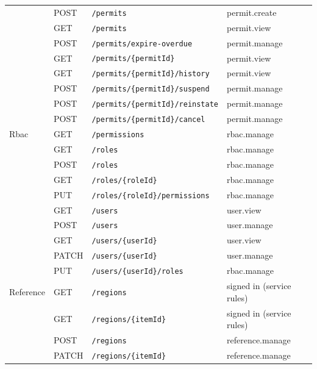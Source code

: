 \begin{longtable}{@{}p{2.1cm}l p{6.6cm} p{3.2cm}@{}}
 & POST & \texttt{/\allowbreak{}permits} & permit.create \\
 & GET & \texttt{/\allowbreak{}permits} & permit.view \\
 & POST & \texttt{/\allowbreak{}permits/\allowbreak{}expire-overdue} & permit.manage \\
 & GET & \texttt{/\allowbreak{}permits/\allowbreak{}\{permitId\}} & permit.view \\
 & GET & \texttt{/\allowbreak{}permits/\allowbreak{}\{permitId\}/\allowbreak{}history} & permit.view \\
 & POST & \texttt{/\allowbreak{}permits/\allowbreak{}\{permitId\}/\allowbreak{}suspend} & permit.manage \\
 & POST & \texttt{/\allowbreak{}permits/\allowbreak{}\{permitId\}/\allowbreak{}reinstate} & permit.manage \\
 & POST & \texttt{/\allowbreak{}permits/\allowbreak{}\{permitId\}/\allowbreak{}cancel} & permit.manage \\
Rbac & GET & \texttt{/\allowbreak{}permissions} & rbac.manage \\
 & GET & \texttt{/\allowbreak{}roles} & rbac.manage \\
 & POST & \texttt{/\allowbreak{}roles} & rbac.manage \\
 & GET & \texttt{/\allowbreak{}roles/\allowbreak{}\{roleId\}} & rbac.manage \\
 & PUT & \texttt{/\allowbreak{}roles/\allowbreak{}\{roleId\}/\allowbreak{}permissions} & rbac.manage \\
 & GET & \texttt{/\allowbreak{}users} & user.view \\
 & POST & \texttt{/\allowbreak{}users} & user.manage \\
 & GET & \texttt{/\allowbreak{}users/\allowbreak{}\{userId\}} & user.view \\
 & PATCH & \texttt{/\allowbreak{}users/\allowbreak{}\{userId\}} & user.manage \\
 & PUT & \texttt{/\allowbreak{}users/\allowbreak{}\{userId\}/\allowbreak{}roles} & rbac.manage \\
Reference & GET & \texttt{/\allowbreak{}regions} & signed in (service rules) \\
 & GET & \texttt{/\allowbreak{}regions/\allowbreak{}\{itemId\}} & signed in (service rules) \\
 & POST & \texttt{/\allowbreak{}regions} & reference.manage \\
 & PATCH & \texttt{/\allowbreak{}regions/\allowbreak{}\{itemId\}} & reference.manage \\

\end{longtable}
